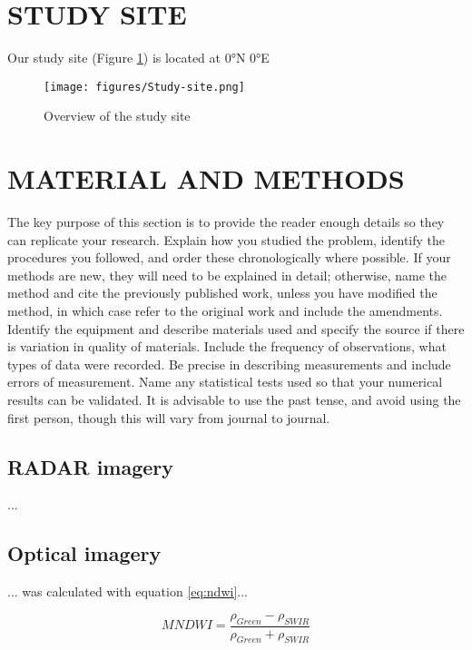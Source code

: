 \documentclass[a4paper, 10pt, conference]{ieeeconf}      %
\begin{document}
\section{STUDY SITE}

Our study site (Figure \ref{fig:studysite}) is located at \ang{0}N \ang{0}E  


\begin{figure}[h]
\centering
\texttt{[image: figures/Study-site.png]}
\caption{Overview of the study site}
\label{fig:studysite}
\end{figure}

\section{MATERIAL AND METHODS}

 The key purpose of this section is to provide the reader enough details so they can replicate your research. Explain how you studied the problem, identify the procedures you followed, and order these chronologically where possible. If your methods are new, they will need to be explained in detail; otherwise, name the method and cite the previously published work, unless you have modified the method, in which case refer to the original work and include the amendments. Identify the equipment and describe materials used and specify the source if there is variation in quality of materials. Include the frequency of observations, what types of data were recorded. Be precise in describing measurements and include errors of measurement. Name any statistical tests used so that your numerical results can be validated. It is advisable to use the past tense, and avoid using the first person, though this will vary from journal to journal.

\subsection{RADAR imagery}

... 


\subsection{Optical imagery}

... was calculated with equation \ref{eq:ndwi}...

\begin{equation}
\label{eq:ndwi}
MNDWI = \frac{\rho_{Green}-\rho_{SWIR}}{\rho_{Green}+\rho_{SWIR}}
\end{equation}
\end{document}

